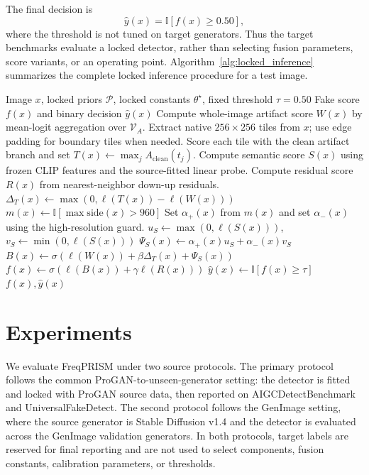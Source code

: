 \documentclass[lettersize,journal]{IEEEtran}
\begin{document}
The final decision is
\begin{equation}
    \hat{y}(x)=\mathbb{I}\left[f(x)\geq 0.50\right],
\end{equation}
where the threshold is not tuned on target generators. Thus the target benchmarks evaluate a locked detector, rather than selecting fusion parameters, score variants, or an operating point. Algorithm~\ref{alg:locked_inference} summarizes the complete locked inference procedure for a test image.

\begin{algorithm}[t]
\caption{Locked multi-prior scoring}
\label{alg:locked_inference}
\begin{algorithmic}[1]
\REQUIRE Image $x$, locked priors $\mathcal{P}$, locked constants $\theta^\star$, fixed threshold $\tau=0.50$
\ENSURE Fake score $f(x)$ and binary decision $\hat{y}(x)$
\STATE Compute whole-image artifact score $W(x)$ by mean-logit aggregation over $\mathcal{V}_A$.
\STATE Extract native $256\times256$ tiles from $x$; use edge padding for boundary tiles when needed.
\STATE Score each tile with the clean artifact branch and set $T(x)\leftarrow\max_j A_{\mathrm{clean}}(t_j)$.
\STATE Compute semantic score $S(x)$ using frozen CLIP features and the source-fitted linear probe.
\STATE Compute residual score $R(x)$ from nearest-neighbor down-up residuals.
\STATE $\Delta_T(x)\leftarrow\max(0,\ell(T(x))-\ell(W(x)))$
\STATE $m(x)\leftarrow\mathbb{I}[\max\mathrm{side}(x)>960]$
\STATE Set $\alpha_+(x)$ from $m(x)$ and set $\alpha_-(x)$ using the high-resolution guard.
\STATE $u_S\leftarrow\max(0,\ell(S(x)))$, \quad $v_S\leftarrow\min(0,\ell(S(x)))$
\STATE $\Psi_S(x)\leftarrow\alpha_+(x)u_S+\alpha_-(x)v_S$
\STATE $B(x)\leftarrow\sigma(\ell(W(x))+\beta\Delta_T(x)+\Psi_S(x))$
\STATE $f(x)\leftarrow\sigma(\ell(B(x))+\gamma\ell(R(x)))$
\STATE $\hat{y}(x)\leftarrow\mathbb{I}[f(x)\geq\tau]$
\RETURN $f(x),\hat{y}(x)$
\end{algorithmic}
\end{algorithm}

\section{Experiments}
\label{sec:experiments}
We evaluate FreqPRISM under two source protocols. The primary protocol follows the common ProGAN-to-unseen-generator setting: the detector is fitted and locked with ProGAN source data, then reported on AIGCDetectBenchmark~\cite{zhong2023patchcraft} and UniversalFakeDetect. The second protocol follows the GenImage setting, where the source generator is Stable Diffusion v1.4 and the detector is evaluated across the GenImage validation generators. In both protocols, target labels are reserved for final reporting and are not used to select components, fusion constants, calibration parameters, or thresholds.
\end{document}
